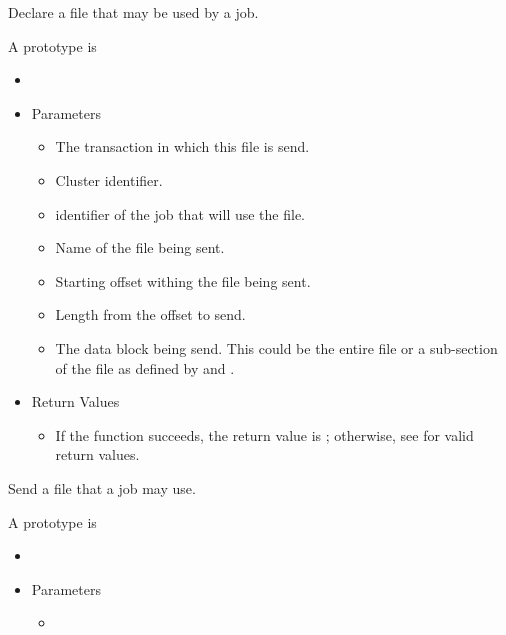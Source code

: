 \begin{description}
  Declare a file that may be used by a job.
\item [\Code{sendFile}]
  A prototype is 

  \begin{itemize}
    \item[] 
    \item[] Parameters
    \begin{itemize}
      \item[]  

      The transaction in which this file is send.
      \item[]  

      Cluster identifier.
      \item[] 

      identifier of the job that will use the file.
      \item[] 

      Name of the file being sent.
      \item[]  

      Starting offset withing the file being sent.
      \item[] 

      Length from the offset to send.
      \item[] 

      The data block being send.  This could be the entire file or a
      sub-section of the file as defined by  and 
      .
    \end{itemize}
    \item[] Return Values
    \begin{itemize}
      \item[] If the function succeeds, the return value is ; 
      otherwise, see  for valid return values. 
    \end{itemize}
  \end{itemize}  

  Send a file that a job may use.
\item [\Code{getFile}]
  A prototype is 

  \begin{itemize}
    \item[] 
    \item[] Parameters
    \begin{itemize}
      \item[]  


\end{itemize}
\end{itemize}
\end{description}
